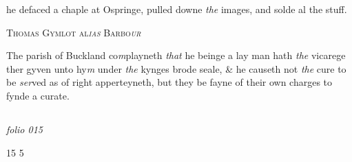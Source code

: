 \documentclass[12pt, a4paper]{book}
\begin{document}
		\ifthenelse{\isodd{\thepage}}
		{\reversemarginpar}
		{\normalmarginpar}
		he defaced a chaple at Ospringe, pulled downe \textit{the} images, and solde al the stuff.
 

            
            
            	
				\begin{center} \begin{large} {\scshape Thomas Gymlot al\textit{ias} Barbo\textit{ur}
               } \end{large} \end{center}
			
            	
		\ifthenelse{\isodd{\thepage}}
		{\reversemarginpar}
		{\normalmarginpar}
		The parish of Buckland co\textit{m}playneth \textit{that} he beinge
 a lay man hath \textit{the} vicarege ther gyven unto hy\textit{m}
 under \textit{the} kynges brode seale, \& he causeth not \textit{the} cure
 to be \textit{ser}ved as of right apperteyneth, but they be
 fayne of their own charges to fynde a curate.


            
\dotfill
					  \subsection*{}  \subsection*{}  \subsection*{}  \subsection*{}  \subsection*{}

\textit{folio 015}


\begin{flushright}{\color{Mahogany}15} 5\end{flushright}
 
\end{document}
